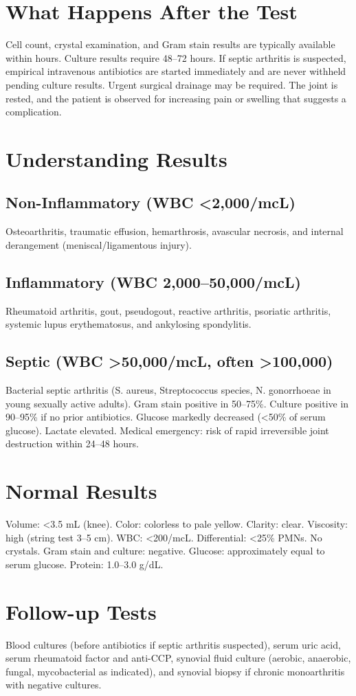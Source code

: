 \section*{What Happens After the Test}
Cell count, crystal examination, and Gram stain results are typically available within hours. Culture results require 48--72 hours. If septic arthritis is suspected, empirical intravenous antibiotics are started immediately and are never withheld pending culture results. Urgent surgical drainage may be required. The joint is rested, and the patient is observed for increasing pain or swelling that suggests a complication.
\section*{Understanding Results}
\subsection*{Non-Inflammatory (WBC <2,000/mcL)}
Osteoarthritis, traumatic effusion, hemarthrosis, avascular necrosis, and internal derangement (meniscal/ligamentous injury).
\subsection*{Inflammatory (WBC 2,000--50,000/mcL)}
Rheumatoid arthritis, gout, pseudogout, reactive arthritis, psoriatic arthritis, systemic lupus erythematosus, and ankylosing spondylitis.
\subsection*{Septic (WBC >50,000/mcL, often >100,000)}
Bacterial septic arthritis (S. aureus, Streptococcus species, N. gonorrhoeae in young sexually active adults). Gram stain positive in 50--75\%. Culture positive in 90--95\% if no prior antibiotics. Glucose markedly decreased (<50\% of serum glucose). Lactate elevated. Medical emergency: risk of rapid irreversible joint destruction within 24--48 hours.
\section*{Normal Results}
Volume: <3.5 mL (knee). Color: colorless to pale yellow. Clarity: clear. Viscosity: high (string test 3--5 cm). WBC: <200/mcL. Differential: <25\% PMNs. No crystals. Gram stain and culture: negative. Glucose: approximately equal to serum glucose. Protein: 1.0--3.0 g/dL.
\section*{Follow-up Tests}
Blood cultures (before antibiotics if septic arthritis suspected), serum uric acid, serum rheumatoid factor and anti-CCP, synovial fluid culture (aerobic, anaerobic, fungal, mycobacterial as indicated), and synovial biopsy if chronic monoarthritis with negative cultures.

